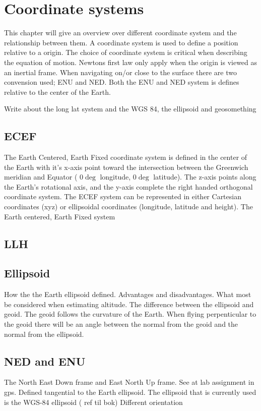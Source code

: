 
\chapter{Coordinate systems}
This chapter will give an overview over different coordinate system and the relationship between them. A coordinate system is used to define a position relative to a origin. The choice of coordinate system is critical when describing the equation of motion. Newtons first law only apply when the origin is viewed as an inertial frame. When navigating on/or close to the surface there are two convension used; ENU and NED. Both the ENU and NED system is defines relative to the center of the Earth.

Write about the long lat system and the WGS 84, the ellipsoid and geosomething
\section{ECEF}
The Earth Centered, Earth Fixed coordinate system is defined in the center of the Earth with it's x-axis point toward the intersection between the Greenwich meridian and Equator ( $0\deg $ longitude, $0\deg $ latitude). The z-axis points along the Earth's rotational axis, and the y-axis complete the right handed orthogonal coordinate system. The ECEF system can be represented in either Cartesian coordinates (xyz) or ellipsoidal coordinates (longitude, latitude and height). 
The Earth centered, Earth Fixed system
\section{LLH}
\section{Ellipsoid}
How the the Earth ellipsoid defined. Advantages and disadvantages. What most be considered when estimating altitude. The difference between the ellipsoid and geoid. The geoid follows the curvature of the Earth. When flying perpenticular to the geoid there will be an angle between the normal from the geoid and the normal from the ellipsoid. 
\section{NED and ENU}
The North East Down frame and East North Up frame. See at lab assignment in gps.
Defined tangential to the Earth ellipsoid. The ellipsoid that is currently used is the WGS-84 ellipsoid ( ref til bok)
Different orientation
\cleardoublepage